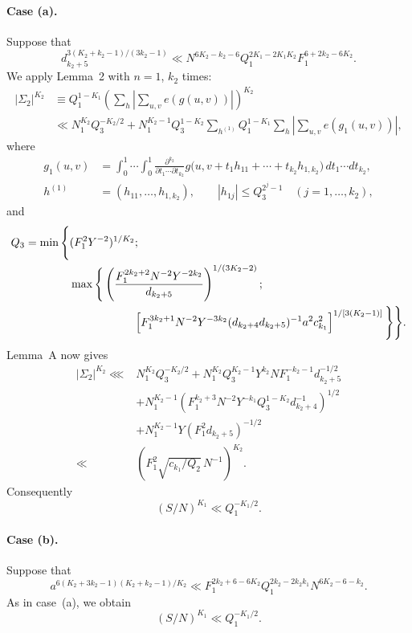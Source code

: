 \documentclass[10pt]{article}
\begin{document}
\paragraph{Case (a).}
Suppose that
\begin{equation}
  d_{k_2+5}^{3(K_2+k_2-1)/(3k_2-1)}
  \ll N^{6K_2-k_2-6}Q_1^{2K_1-2K_1K_2}F_1^{6+2k_2-6K_2}.
  \tag{a}
\end{equation}
We apply Lemma~2 with $n=1$, $k_2$ times:
\[
\begin{aligned}
  |\Sigma_2|^{K_2}
  &\equiv Q_1^{1-K_1}
    \left(\sum_h\left|\sum_{u,v}e(g(u,v))\right|\right)^{K_2}\\
  &\ll N_1^{K_2}Q_3^{-K_2/2}
   +N_1^{K_2-1}Q_3^{1-K_2}
    \sum_{h^{(1)}}Q_1^{1-K_1}\sum_h
      \left|\sum_{u,v}e(g_1(u,v))\right|,
\end{aligned}
\]
where
\[
\begin{aligned}
  g_1(u,v)
  &=\int_0^1\!\cdots\!\int_0^1
    \frac{\partial^{k_2}}{\partial t_1\cdots\partial t_{k_2}}
    g\bigl(u,v+t_1h_{11}+\cdots+t_{k_2}h_{1,k_2}\bigr)
    \,dt_1\cdots dt_{k_2},\\
  h^{(1)}&=(h_{11},\ldots,h_{1,k_2}),
  \qquad |h_{1j}|\leqslant Q_3^{2^j-1}
  \quad(j=1,\ldots,k_2),
\end{aligned}
\]
and
\[
\begin{aligned}
  Q_3=\min\Bigg\{&(F_1^2Y^{-2})^{1/K_2};\\
  &\max\Bigg\{
    \left(\frac{F_1^{2k_2+2}N^{-2}Y^{-2k_2}}{d_{k_2+5}}\right)^{1/(3K_2-2)};\\
  &\hspace{20mm}
    \left[
      F_1^{3k_2+1}N^{-2}Y^{-3k_2}
      (d_{k_2+4}d_{k_2+5})^{-1}a^2c_{k_1}^2
    \right]^{1/[3(K_2-1)]}
  \Bigg\}\Bigg\}.
\end{aligned}
\]
Lemma~A now gives
\[
\begin{aligned}
  |\Sigma_2|^{K_2}
  \lll{}&N_1^{K_2}Q_3^{-K_2/2}
  +N_1^{K_2}Q_3^{K_2-1}Y^{k_2}NF_1^{-k_2-1}d_{k_2+5}^{-1/2}\\
  &+N_1^{K_2-1}
    \left(F_1^{k_2+3}N^{-2}Y^{-k_1}Q_3^{1-K_2}d_{k_2+4}^{-1}\right)^{1/2}\\
  &+N_1^{K_2-1}Y(F_1^2d_{k_2+5})^{-1/2}\\
  \ll{}&\left(F_1^2\sqrt{c_{k_1}/Q_2}\,N^{-1}\right)^{K_2}.
\end{aligned}
\]
Consequently
\[
  (S/N)^{K_1}\ll Q_1^{-K_1/2}.
\]

\paragraph{Case (b).}
Suppose that
\begin{equation}
  a^{6(K_2+3k_2-1)(K_2+k_2-1)/K_2}
  \ll F_1^{2k_2+6-6K_2}Q_1^{2k_2-2k_2k_1}N^{6K_2-6-k_2}.
  \tag{b}
\end{equation}
As in case~(a), we obtain
\[
  (S/N)^{K_1}\ll Q_1^{-K_1/2}.
\]
\end{document}
